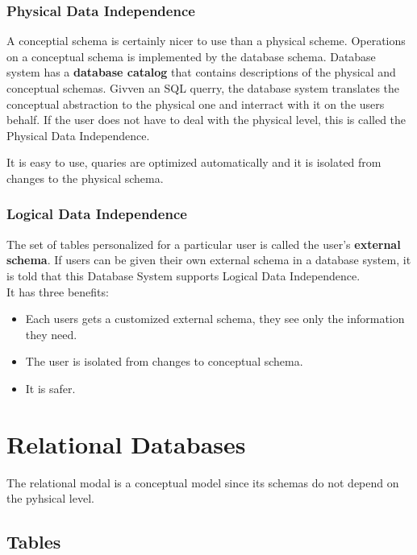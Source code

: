 \documentclass[11pt,a4paper,twocolumn]{book}
\begin{document}
\subsubsection{Physical Data Independence}

A conceptial schema is certainly nicer to use than a physical scheme. Operations on a conceptual schema is implemented by the database schema. Database system has a \textbf{database catalog} that contains descriptions of the physical and conceptual schemas. Givven an SQL querry, the database system translates the conceptual abstraction to the physical one and interract with it on the users behalf. If the user does not have to deal with the physical level, this is called the Physical Data Independence.

It is easy to use, quaries are optimized automatically and it is isolated from changes to the physical schema.

\subsubsection{Logical Data Independence}

The set of tables personalized for a particular user is called the user's \textbf{external schema}. If users can be given their own external schema in a database system, it is told that this Database System supports Logical Data Independence.\\

It has three benefits:

\begin{itemize}
\item Each users gets a customized external schema, they see only the information they need.
\item The user is isolated from changes to conceptual schema.
\item It is safer.
\end{itemize}

\section{Relational Databases}

The relational modal is a conceptual model since its schemas do not depend on the pyhsical level.

\subsection{Tables}
\end{document}
